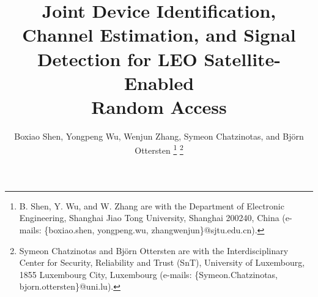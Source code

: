 \documentclass[conference]{IEEEtran}
\begin{document}
	
	\title{Joint Device Identification, Channel Estimation, and Signal Detection for LEO Satellite-Enabled \\Random Access}
	
	\author{Boxiao Shen, Yongpeng Wu, Wenjun Zhang, Symeon Chatzinotas, and Björn Ottersten 
		\thanks{B. Shen, Y. Wu, and W. Zhang are with the Department of Electronic Engineering, Shanghai Jiao Tong
			University, Shanghai 200240, China (e-mails:
			\{boxiao.shen, yongpeng.wu, zhangwenjun\}@sjtu.edu.cn).
		}
		\thanks{
			Symeon Chatzinotas and Björn Ottersten are with the Interdisciplinary Center for Security, Reliability
			and Trust (SnT), University of Luxembourg, 1855 Luxembourg City, Luxembourg (e-mails: 
			\{Symeon.Chatzinotas, bjorn.ottersten\}@uni.lu).
		}
	}
	
	\maketitle
	
\end{document}
